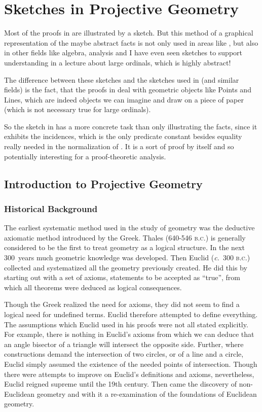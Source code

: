 %
%

\section{Sketches in Projective Geometry}
\label{sec:sketch}

Most of the proofs in \pg are illustrated by a sketch. But this method
of a graphical representation of the maybe abstract facts is not only
used in areas like \pg, but also in other fields like algebra,
analysis and I have even seen sketches to support understanding in a
lecture about large ordinals, which is highly abstract!

The difference between these sketches and the sketches used in \pg
(and similar fields) is the fact, that the proofs in \pg deal with
geometric objects like Points and Lines, which are indeed objects we
can imagine and draw on a piece of paper (which is not necessary true
for large ordinals).

So the sketch in \pg has a more concrete task than only illustrating
the facts, since it exhibits the incidences, which is the only
predicate constant besides equality really needed in the normalization
of \pg. It is a sort of proof by itself and so potentially interesting
for a proof-theoretic analysis.


\subsection{Introduction to Projective Geometry}
\label{sec:sketch:intro}

\subsubsection{Historical Background\label{:projective:history}}
The earliest systematic method used in the study of geometry was the
deductive axiomatic method introduced by the Greek. Thales
(640-546 {\scshape b.c.}) is generally considered to be the first to
treat geometry as a logical structure. In the next 300~years much
geometric knowledge was developed. Then Euclid (\textit{c.}~300
{\scshape b.c.}) collected and systematized all the geometry previously
created. He did this by starting out with a set of axioms, statements
to be accepted as ``true'', from which all theorems were deduced as
logical consequences.

Though the Greek realized the need for axioms, they did not seem to
find a logical need for undefined terms. Euclid therefore attempted to
define everything. The assumptions which
Euclid used in his proofs were not all stated explicitly. For example,
there is nothing in Euclid's axioms from which we can deduce that an
angle bisector of a triangle will intersect the opposite side. 
Further, where constructions demand the intersection of two circles, or of
a line and a circle, Euclid simply assumed the existence of the needed
points of intersection. Though there were attempts to improve on
Euclid's definitions and axioms, nevertheless,
Euclid reigned supreme  until the 19th century. Then came the
discovery of non-Euclidean 
geometry and with it a re-examination of the foundations of Euclidean
geometry.


